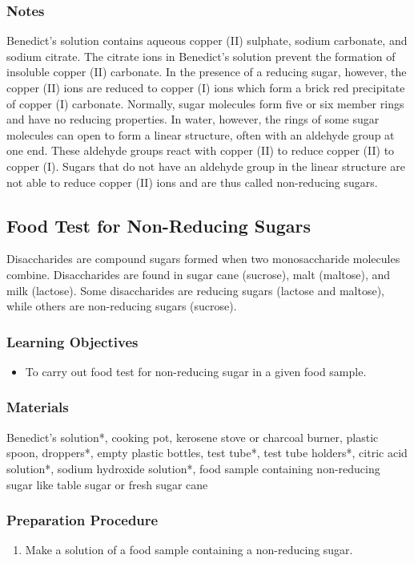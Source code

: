 \subsubsection*{Notes}
Benedict's solution contains aqueous copper (II) sulphate, sodium carbonate, and sodium citrate. The citrate ions in Benedict's solution prevent the formation of insoluble copper (II) carbonate. In the presence of a reducing sugar, however, the copper (II) ions are reduced to copper (I) ions which form a brick red precipitate of copper (I) carbonate.
Normally, sugar molecules form five or six member rings and have no reducing properties. In water, however, the rings of some sugar molecules can open to form a linear structure, often with an aldehyde group at one end. These aldehyde groups react with copper (II) to reduce copper (II) to copper (I). Sugars that do not have an aldehyde group in the linear structure are not able to reduce copper (II) ions and are thus called non-reducing sugars.

\subsection{Food Test for Non-Reducing Sugars}
Disaccharides are compound sugars formed when two monosaccharide molecules combine. Disaccharides are found in sugar cane (sucrose), malt (maltose), and milk (lactose). Some disaccharides are reducing sugars (lactose and maltose), while others are non-reducing sugars (sucrose).

\subsubsection*{Learning Objectives}
\begin{itemize}
\item{To carry out food test for non-reducing sugar in a given food sample.}
\end{itemize}

\subsubsection*{Materials}
Benedict's solution*, cooking pot, kerosene stove or charcoal burner, plastic spoon, droppers*, empty plastic bottles, test tube*, test tube holders*, citric acid solution*, sodium hydroxide solution*, food sample containing non-reducing sugar like table sugar or fresh sugar cane

\subsubsection*{Preparation Procedure}
\begin{enumerate}
\item{Make a solution of a food sample containing a non-reducing sugar.}
\end{enumerate}


